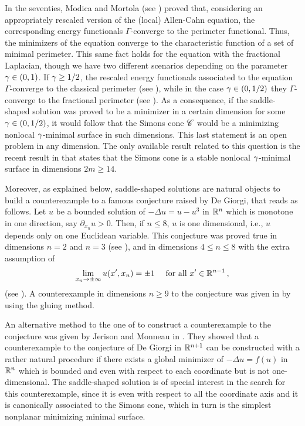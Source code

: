 In the seventies, Modica and Mortola (see \cite{Modica,ModicaMortola}) proved that, considering an appropriately rescaled version of the (local) Allen-Cahn equation, the corresponding energy functionals $\Gamma$-converge to the perimeter functional. Thus, the minimizers of the equation converge to the characteristic function of a set of minimal perimeter. This same fact holds for the equation with the fractional Laplacian, though we have two different scenarios depending on the parameter $\gamma \in (0,1)$. If $\gamma \geq 1/2$, the rescaled energy functionals associated to the equation $\Gamma$-converge to the classical perimeter (see \cite{GiovanniBouchitteSeppecher,Gonzalez}), while in the case $\gamma \in (0,1/2)$ they $\Gamma$-converge to the fractional perimeter (see \cite{SavinValdinoci-GammaConvergence}). As a consequence, if the saddle-shaped solution was proved to be a minimizer in a certain dimension for some $\gamma \in (0,1/2)$, it would follow that the Simons cone $\mathscr{C}$ would be a minimizing nonlocal $\gamma$-minimal surface in such dimensions. This last statement is an open problem in any dimension. The only available result related to this question is the recent result in \cite{Felipe-Sanz-Perela:SaddleFractional} that states that the Simons cone is a stable nonlocal $\gamma$-minimal surface in dimensions $2m\geq 14$.


Moreover, as explained below, saddle-shaped solutions are natural objects to build a counterexample to a famous conjecture raised by De Giorgi, that reads as follows. Let $u$ be a bounded solution of $-\Delta  u = u - u^3$ in $\mathbb{R}^n$ which is monotone in one direction, say $\partial_{x_n} u > 0$. Then, if $n\leq 8$, $u$ is one dimensional, i.e., $u$ depends only on one Euclidean variable. This conjecture was proved true in dimensions $n=2$ and  $n=3$ (see \cite{GhoussoubGui,AmbrosioCabre}), and in dimensions $4\leq n \leq 8$ with the extra assumption of
\begin{equation}
\label{Eq:SavinCondition}
\lim_{x_n \to \pm \infty} u(x',x_n) = \pm 1 \quad \text{ for all } x'\in \mathbb{R}^{n-1}\,,
\end{equation}
(see \cite{Savin-DeGiorgi}). A counterexample in dimensions $n\geq 9$ to the conjecture was given in \cite{delPinoKowalczykWei} by using the gluing method. 

An alternative method to the one of \cite{delPinoKowalczykWei} to construct a counterexample to the conjecture was given by Jerison and Monneau in \cite{JerisonMonneau}. They showed that a counterexample to the conjecture of De Giorgi in $\mathbb{R}^{n+1}$ can be constructed with a rather natural procedure if there exists a global minimizer of $-\Delta u = f(u)$ in $\mathbb{R}^n$ which is bounded and even with respect to each coordinate but is not one-dimensional. The saddle-shaped solution is of special interest in the search for this counterexample, since it is even with respect to all the coordinate axis and it is canonically associated to the Simons cone, which in turn is the simplest nonplanar minimizing minimal surface.

